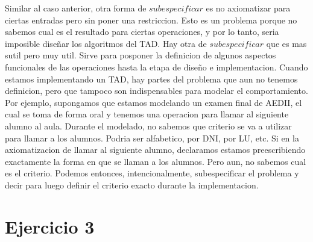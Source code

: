 \documentclass[10pt,a4paper]{article}
\begin{document}
\newline
Similar al caso anterior, otra forma de $subespecificar$ es no axiomatizar para ciertas entradas pero sin poner una restriccion. Esto es un problema porque no sabemos cual es el resultado para ciertas operaciones, y por lo tanto, seria imposible diseñar los algoritmos del TAD.      
\newline
\newline
\newline
Hay otra de $subespecificar$ que es mas sutil pero muy util. Sirve para posponer la definicion de algunos aspectos funcionales de las operaciones hasta la etapa de diseño e implementacion. Cuando estamos implementando un TAD, hay partes del problema que aun no tenemos definicion, pero que tampoco son indispensables para modelar el comportamiento. 
\newline
\newline
Por ejemplo, supongamos que estamos modelando un examen final de AEDII, el cual se toma de forma oral y tenemos una operacion para llamar al siguiente alumno al aula. Durante el modelado, no sabemos que criterio se va a utilizar para llamar a los alumnos. Podria ser alfabetico, por DNI, por LU, etc. Si en la axiomatizacion de llamar al siguiente alumno, declaramos  estamos preescribiendo exactamente la forma en que se llaman a los alumnos. Pero aun, no sabemos cual es el criterio. Podemos entonces, intencionalmente, subespecificar el problema y decir  para luego definir el criterio exacto durante la implementacion.  
\newpage

\section{Ejercicio 3}
\end{document}
